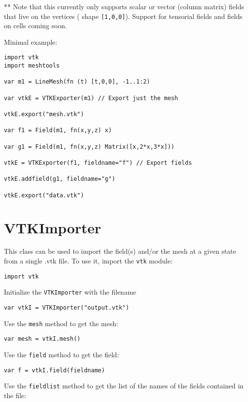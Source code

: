 ** Note that this currently only supports scalar or vector (column
matrix) fields that live on the vertices ( shape \texttt{{[}1,0,0{]}}).
Support for tensorial fields and fields on cells coming soon.

Minimal example:

\begin{lstlisting}
import vtk
import meshtools

var m1 = LineMesh(fn (t) [t,0,0], -1..1:2)

var vtkE = VTKExporter(m1) // Export just the mesh 

vtkE.export("mesh.vtk")

var f1 = Field(m1, fn(x,y,z) x)

var g1 = Field(m1, fn(x,y,z) Matrix([x,2*x,3*x]))

vtkE = VTKExporter(f1, fieldname="f") // Export fields

vtkE.addfield(g1, fieldname="g")

vtkE.export("data.vtk")
\end{lstlisting}

\hypertarget{vtkimporter}{%
\section{VTKImporter}\label{vtkimporter}}

This class can be used to import the field(s) and/or the mesh at a given
state from a single .vtk file. To use it, import the \texttt{vtk}
module:

\begin{lstlisting}
import vtk
\end{lstlisting}

Initialize the \texttt{VTKImporter} with the filename

\begin{lstlisting}
var vtkI = VTKImporter("output.vtk")
\end{lstlisting}

Use the \texttt{mesh} method to get the mesh:

\begin{lstlisting}
var mesh = vtkI.mesh()
\end{lstlisting}

Use the \texttt{field} method to get the field:

\begin{lstlisting}
var f = vtkI.field(fieldname)
\end{lstlisting}

Use the \texttt{fieldlist} method to get the list of the names of the
fields contained in the file:

